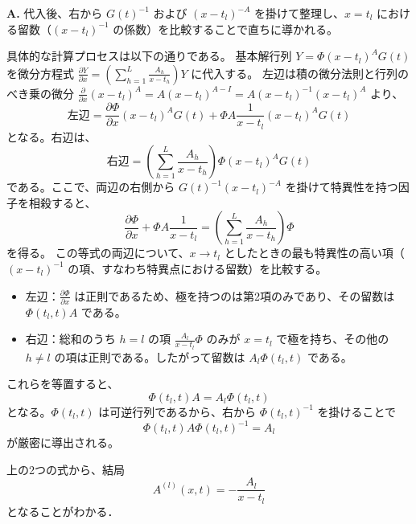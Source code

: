 \begin{Q}[$x=t_l$ における局所表示 $Y(x,t) = \Phi(x,t)(x-t_l)^A G(t)$ をシュレジンガー系に代入すると、なぜ $\Phi(t_l, t) A \Phi(t_l, t)^{-1} = A_l$ が得られるのか？]
\textbf{A.} 代入後、右から $G(t)^{-1}$ および $(x-t_l)^{-A}$ を掛けて整理し、$x=t_l$ における留数（$(x-t_l)^{-1}$ の係数）を比較することで直ちに導かれる。

具体的な計算プロセスは以下の通りである。
基本解行列 $Y = \Phi (x-t_l)^A G(t)$ を微分方程式 $\frac{\partial Y}{\partial x} = \left( \sum_{h=1}^L \frac{A_h}{x-t_h} \right) Y$ に代入する。
左辺は積の微分法則と行列のべき乗の微分 $\frac{\partial}{\partial x}(x-t_l)^A = A(x-t_l)^{A-I} = A(x-t_l)^{-1}(x-t_l)^A$ より、
\[
  \text{左辺} = \frac{\partial \Phi}{\partial x}(x-t_l)^A G(t) + \Phi A \frac{1}{x-t_l} (x-t_l)^A G(t)
\]
となる。右辺は、
\[
  \text{右辺} = \left( \sum_{h=1}^L \frac{A_h}{x-t_h} \right) \Phi (x-t_l)^A G(t)
\]
である。ここで、両辺の右側から $G(t)^{-1} (x-t_l)^{-A}$ を掛けて特異性を持つ因子を相殺すると、
\[
  \frac{\partial \Phi}{\partial x} + \Phi A \frac{1}{x-t_l} = \left( \sum_{h=1}^L \frac{A_h}{x-t_h} \right) \Phi
\]
を得る。
この等式の両辺について、$x \to t_l$ としたときの最も特異性の高い項（$(x-t_l)^{-1}$ の項、すなわち特異点における留数）を比較する。
\begin{itemize}
    \item 左辺：$\frac{\partial \Phi}{\partial x}$ は正則であるため、極を持つのは第2項のみであり、その留数は $\Phi(t_l, t) A$ である。
    \item 右辺：総和のうち $h=l$ の項 $\frac{A_l}{x-t_l}\Phi$ のみが $x=t_l$ で極を持ち、その他の $h \neq l$ の項は正則である。したがって留数は $A_l \Phi(t_l, t)$ である。
\end{itemize}
これらを等置すると、
\[
  \Phi(t_l, t) A = A_l \Phi(t_l, t)
\]
となる。$\Phi(t_l, t)$ は可逆行列であるから、右から $\Phi(t_l, t)^{-1}$ を掛けることで
\[
  \Phi(t_l, t) A \Phi(t_l, t)^{-1} = A_l
\]
が厳密に導出される。
\end{Q}

上の2つの式から、結局
\begin{equation*}
  A^{(l)}(x,t) = - \frac{A_l}{x-t_l}
\end{equation*}
となることがわかる．

